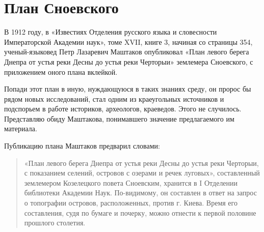 \chapter{План Сноевского}

В 1912 году, в «Известиях Отделения русского языка и словесности Императорской Академии наук», томе XVII, книге 3, начиная со страницы 354, ученый-языковед Петр Лазаревич Маштаков опубликовал «План левого берега Днепра от устья реки Десны до устья реки Черторыи» землемера Сноевского, с приложением оного плана вклейкой.

Попади этот план в иную, нуждающуюся в таких знаниях среду, он пророс бы рядом новых исследований, стал одним из краеугольных источников и подспорьем в работе историков, археологов, краеведов. Этого не случилось.  Представляю обиду Маштакова, понимавшего значение предлагаемого им материала.

Публикацию плана Маштаков предварил словами:

\begin{quotation}
«План левого берега Днепра от устья реки Десны до устья реки Черторыи, с показанием селений, островов с озерами и речек луговых», составленный землемером Козелецкого повета Сноевским, хранится в I Отделении библиотеки Академии Наук. По-видимому, он составлен в ответ на запрос о топографии островов, расположенных, против г. Киева. Время его составления, судя по бумаге и почерку, можно отнести к первой половине прошлого столетия. 
\end{quotation}

\newpage

